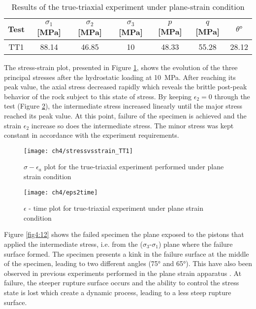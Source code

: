 \begin{table}
    \centering
    \begin{tabular}{ccccccc}
        \hline
        Test & $\sigma_1$ [\si{MPa}] & $\sigma_2$ [\si{MPa}] & $\sigma_3$ [\si{MPa}] & $p$ [\si{MPa}] & $q$ [\si{MPa}] & $\theta \si{\degree}$ \\
        \hline
        \hline
        TT1 &88.14 & 46.85 & 10 & 48.33 & 55.28 & 28.12 \\
        \hline
    \end{tabular}
    \caption{Results of the true-triaxial experiment under plane-strain condition}
    \label{tb4:TT1}
\end{table}

The stress-strain plot, presented in Figure \ref{fig4:10}, shows the evolution of the three principal stresses after the hydrostatic loading at \SI{10}{MPa}. After reaching its peak value, the axial stress decreased rapidly which reveals the brittle post-peak behavior of the rock subject to this state of stress.  By keeping $\epsilon_2 = 0$  through the test (Figure \ref{fig4:11}), the intermediate stress increased linearly until the major stress reached its peak value. At this point, failure of the specimen is achieved and the strain $\epsilon_2$ increase so does the intermediate stress. The minor stress was kept constant in accordance with the experiment requirements.

\begin{figure}[tb]
    \centering
    \texttt{[image: ch4/stressvsstrain\_TT1]}
    \caption{$\sigma-\epsilon_a$ plot for the true-triaxial experiment performed under plane strain condition}
    \label{fig4:10}
\end{figure} 


\begin{figure}[tb]
    \centering
    \texttt{[image: ch4/eps2time]}
    \caption{$\epsilon$ - time plot for true-triaxial experiment under plane strain condition}
    \label{fig4:11}
\end{figure} 

Figure \ref{fig4:12} shows the failed specimen the plane exposed to the pistons that applied the intermediate stress, i.e. from the ($\sigma_3$-$\sigma_1$) plane where the failure surface formed. The specimen presents a kink in the failure surface at the middle of the specimen, leading to two different angles (\ang{75} and \ang{65}). This have also been observed in previous experiments performed in the plane strain apparatus \cite{Labuz1996}. At failure, the steeper rupture surface occurs and the ability to control the stress state is lost which create a dynamic process, leading to a less steep rupture surface. 

